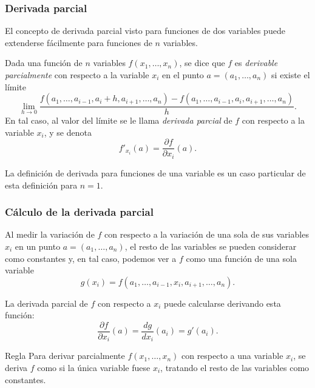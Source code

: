 \begin{frame}
\frametitle{Derivada parcial}
El concepto de derivada parcial visto para funciones de dos variables puede extenderse fácilmente para funciones de $n$ variables.

\begin{definicion}
Dada una función de $n$ variables $f(x_1,\ldots,x_n)$, se dice que $f$ es \emph{derivable parcialmente} con respecto a la variable $x_i$ en el punto $a=(a_1,\ldots,a_n)$ si existe el límite
\[
\lim_{h\rightarrow 0} \frac{f(a_1,\ldots,a_{i-1},a_i+h,a_{i+1},\ldots,a_n)-f(a_1,\ldots,a_{i-1},a_i,a_{i+1},\ldots,a_n)} {h}.
\]
En tal caso, al valor del límite se le llama \emph{derivada parcial} de $f$ con respecto a la variable $x_i$, y se denota
\[
f'_{x_i}(a)=\frac{\partial f}{\partial x_i}(a).
\]
\end{definicion}
La definición de derivada para funciones de una variable es un caso particular de esta definición para $n=1$.
\end{frame}


\begin{frame}
\frametitle{Cálculo de la derivada parcial}
Al medir la variación de $f$ con respecto a la variación de una sola de sus variables $x_i$ en un punto $a=(a_1,\ldots,a_n)$, el resto de las variables se pueden considerar como constantes y, en tal caso, podemos ver a $f$ como una función de una sola variable
\[
g(x_i)=f(a_1,\ldots,a_{i-1},x_i,a_{i+1},\ldots,a_n).
\]

La derivada parcial de $f$ con respecto a $x_i$ puede calcularse derivando esta función:
\[
\frac{\partial f}{\partial x_i}(a)=\frac{dg}{dx_i}(a_i)=g'(a_i).
\]

\begin{block}{Regla}
Para derivar parcialmente $f(x_1,\ldots,x_n)$ con respecto a una variable $x_i$, se deriva $f$ como si la única variable fuese $x_i$, tratando el resto de las variables como constantes.
\end{block} 
\end{frame}


